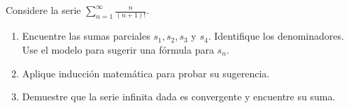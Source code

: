 \item Considere la serie $\displaystyle\sum_{n=1}^\infty \frac{n}{(n+1)!}$.
    \begin{enumerate}
        \item[(a)] Encuentre las sumas parciales $s_1, s_2, s_3$ y $s_4$. Identifique los denominadores. Use el modelo para sugerir una fórmula para $s_n$.
        \item[(b)] Aplique inducción matemática para probar su sugerencia.
        \item[(c)] Demuestre que la serie infinita dada es convergente y encuentre su suma.
    \end{enumerate}
